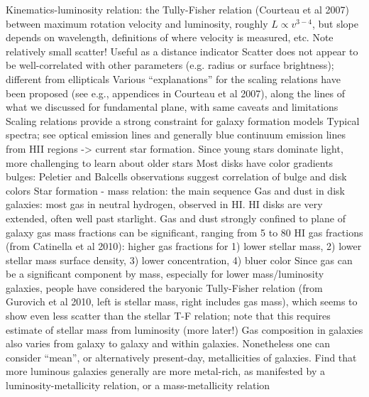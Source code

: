 \documentclass{article}
\begin{document}
    Kinematics-luminosity relation: the Tully-Fisher relation (Courteau et
    al 2007) between maximum rotation velocity and luminosity, roughly
    $L\propto v^{3-4}$, but slope depends on wavelength, definitions of
    where velocity is measured, etc.
    Note relatively small scatter! Useful as a distance indicator
    Scatter does not appear to be well-correlated with other parameters
    (e.g. radius or surface brightness); different from ellipticals
    Various ``explanations'' for the scaling relations have been proposed
    (see e.g., appendices in Courteau et al 2007), along the lines of what
    we discussed for fundamental plane, with same caveats and limitations
    Scaling relations provide a strong constraint for galaxy formation
    models
    Typical spectra; see optical emission lines and generally blue
    continuum
    emission lines from HII regions -> current star formation.
    Since young stars dominate light, more challenging to learn about older
    stars
    Most disks have color gradients
    bulges: Peletier and Balcells observations suggest correlation of bulge
    and disk colors
    Star formation - mass relation: the main sequence
    Gas and dust in disk galaxies: most gas in neutral hydrogen, observed
    in HI. HI disks are very extended, often well past starlight. Gas and
    dust strongly confined to plane of galaxy
    gas mass fractions can be significant, ranging from 5 to 80%
    HI gas fractions (from Catinella et al 2010): higher gas fractions for
    1) lower stellar mass, 2) lower stellar mass surface density, 3) lower
    concentration, 4) bluer color
    Since gas can be a significant component by mass, especially for lower
    mass/luminosity galaxies, people have considered the baryonic
    Tully-Fisher relation (from Gurovich et al 2010, left is stellar mass,
    right includes gas mass), which seems to show even less scatter than
    the stellar T-F relation; note that this requires estimate of stellar
    mass from luminosity (more later!)
    Gas composition in galaxies also varies from galaxy to galaxy and
    within galaxies. Nonetheless one can consider ``mean'', or
    alternatively present-day, metallicities of galaxies. Find that more
    luminous galaxies generally are more metal-rich, as manifested by a
    luminosity-metallicity relation, or a mass-metallicity relation
\end{document}
